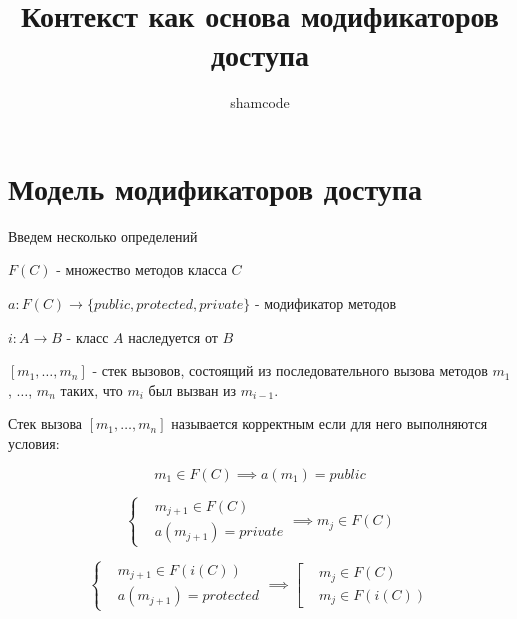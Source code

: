 \documentclass[graybox]{svmult}
\begin{document}
\title*{Контекст как основа модификаторов доступа}
\author{shamcode}
\maketitle


\section{Модель модификаторов доступа}
\label{sec:1}
Введем несколько определений
\begin{definition}
$F(C)$ - множество методов класса $C$
\end{definition}

\begin{definition}
$a: F(C) \to \{public, protected, private\}$ - модификатор методов
\end{definition}

\begin{definition}
$i: A \to B$ - класс $A$ наследуется от $B$
\end{definition}

\begin{definition}
$[m_1, \dots, m_n]$ - стек вызовов, состоящий из последовательного вызова методов $m_1$, $\dots$, $m_n$ таких, что $m_i$ был вызван из $m_{i-1}$.
\end{definition}


\begin{definition}
\label{correct_stack}
Стек вызова  $[m_1, \dots, m_n]$ называется корректным если для него выполняются условия:

\begin{equation}
\label{first_method_public}
m_1 \in F(C) \implies a(m_1) = public
\end{equation}

\begin{equation}
\label{private}
\left\{
\begin{aligned}
&m_{j+1} \in F(C) \\
&a(m_{j+1}) = private
\end{aligned}
\right. 
\implies m_j \in F(C)
\end{equation}

\begin{equation}
\label{protected}
\left\{
	\begin{aligned}
		&m_{j+1} \in F(i(C)) \\
		&a(m_{j+1}) = protected
	\end{aligned}
\right.
\implies
\left[
	\begin{aligned}
		&m_j \in F(C) \\
		&m_j \in F(i(C))
	\end{aligned}
\right.
\end{equation}

\end{definition}
\end{document}
